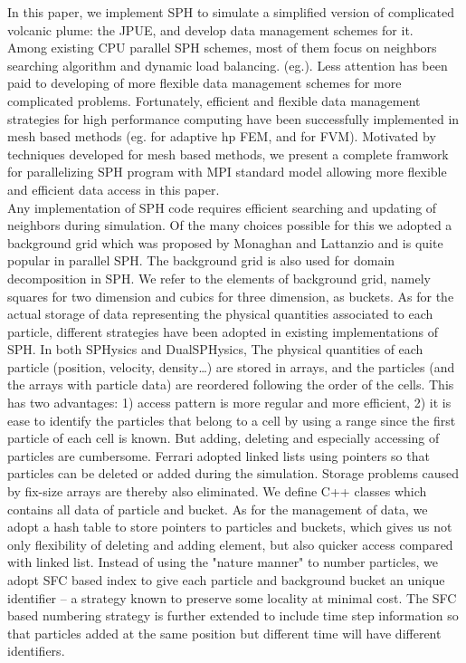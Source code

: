 \documentclass[conference,compsoc]{IEEEtran}
\begin{document}
In this paper, we implement SPH to simulate a simplified version of complicated volcanic plume: the JPUE, and develop data management schemes for it.\\
Among existing CPU parallel SPH schemes, most of them focus on neighbors searching algorithm and dynamic load balancing. (eg.\cite{ferrari2009new, crespo2015dualsphysics}). Less attention has been paid to developing of more flexible data management schemes for more complicated problems. 
Fortunately, efficient and flexible data management strategies for high performance computing have been successfully implemented in mesh based methods (eg. \cite{laszloffy2000simple} for adaptive hp FEM, and \cite{pitman2003computing, patra2005parallel} for FVM). Motivated by techniques developed for mesh based methods, we present a complete framwork for parallelizing SPH program with MPI standard model allowing more flexible and efficient data access in this paper.\\
Any implementation of SPH code requires efficient searching and updating of neighbors during simulation. Of the many choices possible for this we adopted a background grid which was proposed by Monaghan and Lattanzio\cite{monaghan1985refined} and is quite popular in parallel SPH. The background grid is also used for domain decomposition in SPH. We refer to the elements of background grid, namely squares for two dimension and cubics for three dimension, as buckets. 
%
%
As for the actual storage of data representing the physical quantities associated to each particle, different strategies have been adopted in existing implementations of SPH. 
In both SPHysics\cite{dominguez2011optimization} and DualSPHysics\cite{crespo2015dualsphysics}, The physical quantities of each particle (position, velocity, density…) are stored in arrays, and the particles (and the arrays with particle data) are reordered following the order of the cells. This has two advantages: 1) access pattern is more regular and more efficient, 2) it is ease to identify the particles that belong to a cell by using a range since the first particle of each cell is known. But adding, deleting and especially accessing of particles are cumbersome. Ferrari\cite{ferrari2009new} adopted linked lists using pointers so that particles can be deleted or added during the simulation. Storage problems caused by fix-size arrays are thereby also eliminated. We define C++ classes which contains all data of particle and bucket. As for the management of data, we adopt a hash table to store pointers to particles and buckets, which gives us not only flexibility of deleting and adding element, but also quicker access compared with linked list. Instead of using the "nature manner" to number particles, we adopt SFC based index to give each particle and background bucket an unique identifier -- a strategy known to preserve some locality at minimal cost. The SFC based numbering strategy is further extended to include time step information so that particles added at the same position but different time will have different identifiers. 
\end{document}
